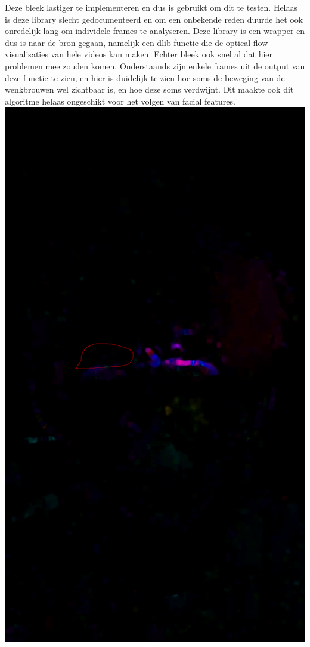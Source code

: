 \documentclass[11pt]{article}
\begin{document}
    Deze bleek lastiger te implementeren en dus is \emph{\citet{pyflow}}  gebruikt om dit te testen. 
    Helaas is deze library slecht gedocumenteerd en om een onbekende reden duurde het ook onredelijk lang om individele frames te analyseren.
    Deze library is een wrapper en dus is naar de bron gegaan, namelijk een dlib functie die de optical flow visualisaties van hele videos kan maken.
    Echter bleek ook snel al dat hier problemen mee zouden komen. 
    Onderstaands zijn enkele frames uit de output van deze functie te zien, en hier is duidelijk te zien hoe soms de beweging van de wenkbrouwen wel zichtbaar is, en hoe deze soms verdwijnt.
    Dit maakte ook dit algoritme helaas ongeschikt voor het volgen van facial features.
    \includegraphics[width=0.6\linewidth]{Images/opticalflow1.png}
\end{document}
